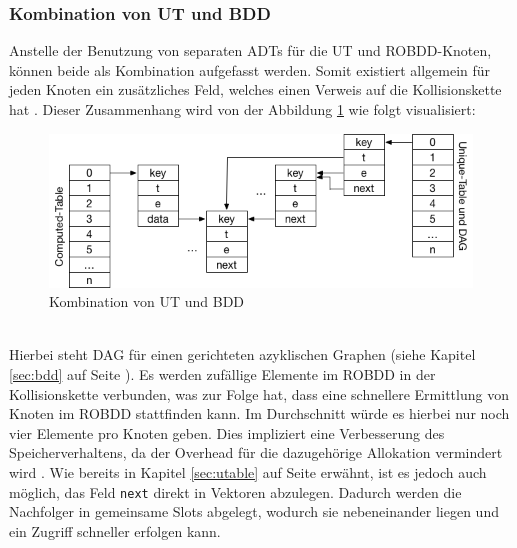 \subsubsection{Kombination von UT und BDD}
\label{sec:utableBdd}
Anstelle der Benutzung von separaten ADTs für die UT und ROBDD-Knoten, können beide als Kombination aufgefasst werden. Somit existiert allgemein für jeden Knoten ein zusätzliches Feld, welches einen Verweis auf die Kollisionskette hat \cite{brb2007}. Dieser Zusammenhang wird von der Abbildung \ref{fig:cutableDag} wie folgt visualisiert:
\begin{figure}[bth]
	\centering
	\includegraphics[scale=0.5]{./img/cutableDag}
	\caption[Kombination von UT und BDD]{Kombination von UT und BDD}
	\label{fig:cutableDag}
\end{figure}\\
\noindent
Hierbei steht DAG für einen gerichteten azyklischen Graphen (siehe Kapitel \ref{sec:bdd} auf Seite \pageref{sec:bdd}). Es werden zufällige Elemente im ROBDD in der Kollisionskette verbunden, was zur Folge hat, dass eine schnellere Ermittlung von Knoten im ROBDD stattfinden kann. Im Durchschnitt würde es hierbei nur noch vier Elemente pro Knoten geben. Dies impliziert eine Verbesserung des Speicherverhaltens, da der Overhead für die dazugehörige Allokation vermindert wird \cite{brb2007}. Wie bereits in Kapitel \ref{sec:utable} auf Seite \pageref{sec:utable} erwähnt, ist es jedoch auch möglich, das Feld \texttt{next} direkt in Vektoren abzulegen. Dadurch werden die Nachfolger in gemeinsame Slots abgelegt, wodurch sie nebeneinander liegen und ein Zugriff schneller erfolgen kann.\\
